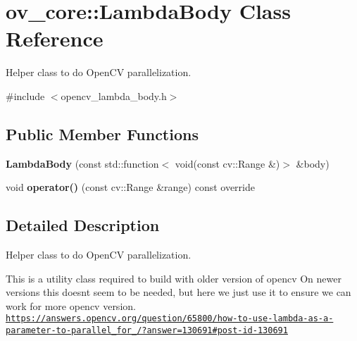 \hypertarget{classov__core_1_1LambdaBody}{}\section{ov\+\_\+core\+:\+:Lambda\+Body Class Reference}
\label{classov__core_1_1LambdaBody}


Helper class to do Open\+CV parallelization.  




{\ttfamily \#include $<$opencv\+\_\+lambda\+\_\+body.\+h$>$}

\subsection*{Public Member Functions}
\begin{DoxyCompactItemize}
\item 
\mbox{\label{classov__core_1_1LambdaBody_a57cc3809565739625b969ac7c8512679}} 
{\bfseries Lambda\+Body} (const std\+::function$<$ void(const cv\+::\+Range \&)$>$ \&body)
\item 
\mbox{\label{classov__core_1_1LambdaBody_a1c5e4804e776da07eddfab15fdfbe325}} 
void {\bfseries operator()} (const cv\+::\+Range \&range) const override
\end{DoxyCompactItemize}


\subsection{Detailed Description}
Helper class to do Open\+CV parallelization. 

This is a utility class required to build with older version of opencv On newer versions this doesn\textquotesingle{}t seem to be needed, but here we just use it to ensure we can work for more opencv version. \href{https://answers.opencv.org/question/65800/how-to-use-lambda-as-a-parameter-to-parallel_for_/?answer=130691#post-id-130691}{\tt https\+://answers.\+opencv.\+org/question/65800/how-\/to-\/use-\/lambda-\/as-\/a-\/parameter-\/to-\/parallel\+\_\+for\+\_\+/?answer=130691\#post-\/id-\/130691} 